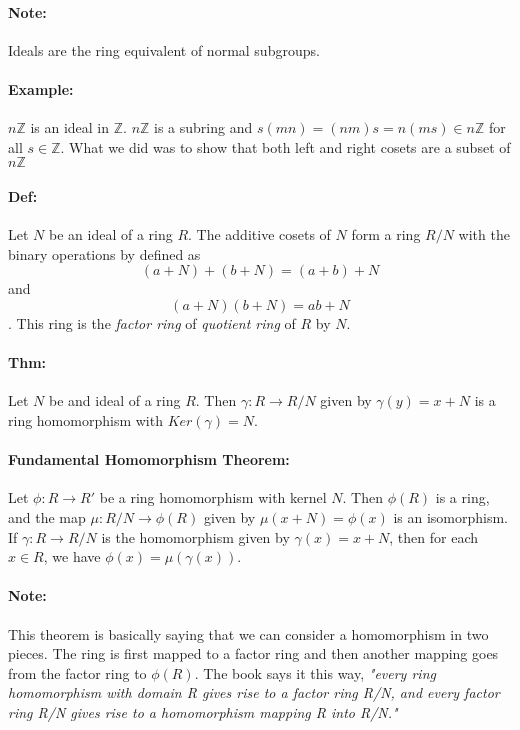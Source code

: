 \documentclass[10pt,a4paper]{article}
\begin{document}
\paragraph{Note:} Ideals are the ring equivalent of normal subgroups.

\paragraph{Example:} $n\mathbb{Z}$ is an ideal in $\mathbb{Z}$. $n\mathbb{Z}$ is a subring and $s(mn) = (nm)s = n(ms) \in n\mathbb{Z}$ for all $s \in \mathbb{Z}$. What we did was to show that both left and right cosets are a subset of $n\mathbb{Z}$

\paragraph{Def:} Let $N$ be an ideal of a ring $R$. The additive cosets of $N$ form a ring $R/N$ with the binary operations by defined as $$ (a+N)+(b+N) = (a+b)+N$$ and $$(a+N)(b+N) = ab+N$$. This ring is the \textit{factor ring} of \textit{quotient ring} of $R$ by $N$.

\paragraph{Thm:} Let $N$ be and ideal of a ring $R$. Then $\gamma : R \to R/N$ given by $\gamma (y) = x+N$ is a ring homomorphism with $Ker(\gamma) = N$.

\paragraph{Fundamental Homomorphism Theorem:} Let $\phi:R \to R'$ be a ring homomorphism with kernel $N$. Then $\phi(R)$ is a ring, and the map $\mu: R/N \to \phi(R)$ given by $\mu(x+N)=\phi(x)$ is an isomorphism. If $\gamma:R \to R/N$ is the homomorphism given by $\gamma(x) = x+N$, then for each $x \in R$, we have $\phi(x) = \mu(\gamma(x))$.

\paragraph{Note:} This theorem is basically saying that we can consider a homomorphism in two pieces. The ring is first mapped to a factor ring and then another mapping goes from the factor ring to $\phi(R)$. The book says it this way, \textit{"every ring homomorphism with domain R gives rise to a factor ring R/N, and every factor ring R/N gives rise to a homomorphism mapping R into R/N."}
\end{document}
